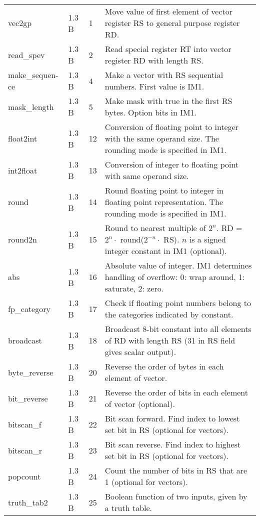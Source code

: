 \documentclass[forwardcom.tex]{subfiles}
\begin{document}
\begin{longtable} {|p{20mm}|p{10mm}|p{8mm}|p{75mm}|}
vec2gp        & 1.3 B &  1 & Move value of first element of vector register RS to general purpose register RD. \\

read\_spev    & 1.3 B &  2 & Read special register RT into vector register RD with  length RS. \\
make\_sequen-ce& 1.3 B &  4 & Make a vector with RS sequential numbers. First value is IM1. \\

mask\_length  & 1.3 B &  5 & Make mask with true in the first RS bytes. Option bits in IM1. \\

float2int     & 1.3 B & 12 & Conversion of floating point to integer with the same operand size. The rounding mode is specified in IM1. \\
int2float     & 1.3 B & 13 & Conversion of integer to floating point with same operand size. \\

round         & 1.3 B & 14 & Round floating point to integer in floating point  representation. The rounding mode is specified in IM1. \\
round2n       & 1.3 B & 15 & Round to nearest multiple of $2^n$. \newline 
RD = $2^n\cdot$ round($2^{-n}\cdot$ RS). $n$ is a signed integer constant in IM1 (optional). \\
abs           & 1.3 B & 16 & Absolute value of integer. IM1 determines handling of overflow: 0: wrap around, 1: saturate, 2: zero. \\

fp\_category  & 1.3 B & 17 & Check if floating point numbers belong to the categories indicated by constant. \\

broadcast     & 1.3 B & 18 & Broadcast 8-bit constant into all elements of RD with length RS (31 in RS field gives scalar output). \\
byte\_reverse & 1.3 B & 20 & Reverse the order of bytes in each element of vector. \\
bit\_reverse  & 1.3 B & 21 & Reverse the order of bits in each element of vector (optional). \\

bitscan\_f    & 1.3 B & 22 & Bit scan forward. Find index to lowest set bit in RS (optional for vectors). \\
bitscan\_r    & 1.3 B & 23 & Bit scan reverse. Find index to highest set bit in RS (optional for vectors). \\
popcount      & 1.3 B & 24 & Count the number of bits in RS that are 1 (optional for vectors). \\
truth\_tab2   & 1.3 B & 25 & Boolean function of two inputs, given by a truth table. \\


\end{longtable}
\end{document}
